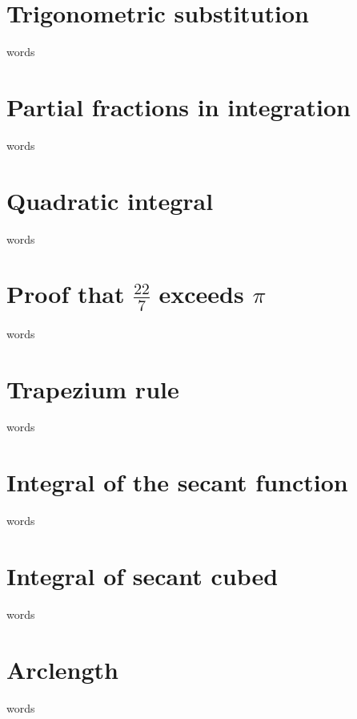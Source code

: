 \section{Trigonometric substitution}
words

\section{Partial fractions in integration}
words

\section{Quadratic integral}
words

\section{Proof that $\frac{22}{7}$ exceeds $\pi$}
words

\section{Trapezium rule}
words

\section{Integral of the secant function}
words

\section{Integral of secant cubed}
words

\section{Arclength}
words
